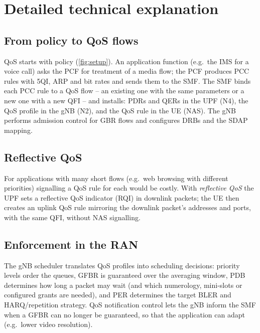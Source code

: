 \documentclass[11pt,a4paper]{article}
\begin{document}
\section{Detailed technical explanation}

\subsection{From policy to QoS flows}
QoS starts with policy (\cref{fig:setup}). An application function (e.g.\ the IMS for a voice call) asks the PCF for treatment of a media
flow; the PCF produces PCC rules with 5QI, ARP and bit rates and sends them to the SMF. The SMF binds each PCC rule to a QoS flow -- an
existing one with the same parameters or a new one with a new QFI -- and installs: PDRs and QERs in the UPF (N4), the QoS profile in the gNB
(N2), and the QoS rule in the UE (NAS). The gNB performs admission control for GBR flows and configures DRBs and the SDAP mapping.

\begin{acnfigure}
  \caption{Establishing a GBR QoS flow triggered by an application function (simplified).}
  \label{fig:setup}
\end{acnfigure}

\subsection{Reflective QoS}
For applications with many short flows (e.g.\ web browsing with different priorities) signalling a QoS rule for each would be costly. With
\emph{reflective QoS} the UPF sets a reflective QoS indicator (RQI) in downlink packets; the UE then creates an uplink QoS rule mirroring the
downlink packet's addresses and ports, with the same QFI, without NAS signalling.

\subsection{Enforcement in the RAN}
The gNB scheduler translates QoS profiles into scheduling decisions: priority levels order the queues, GFBR is guaranteed over the averaging
window, PDB determines how long a packet may wait (and which numerology, mini-slots or configured grants are needed), and PER determines the
target BLER and HARQ/repetition strategy. QoS notification control lets the gNB inform the SMF when a GFBR can no longer be guaranteed, so that
the application can adapt (e.g.\ lower video resolution).
\end{document}
